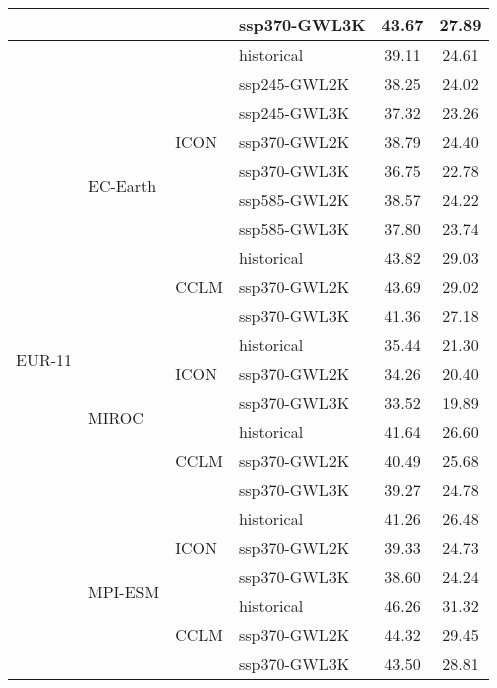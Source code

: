 \begin{table}[!htbp]
\begin{tabular}{lll|l|cc}
 &  &  & ssp370-GWL3K & 43.67 & 27.89 \\
\midrule
\multirow{22}{*}{EUR-11} & \multirow{10}{*}{EC-Earth} & \multirow{7}{*}{ICON} & historical & 39.11 & 24.61 \\
 &  &  & ssp245-GWL2K & 38.25 & 24.02 \\
 &  &  & ssp245-GWL3K & 37.32 & 23.26 \\
 &  &  & ssp370-GWL2K & 38.79 & 24.40 \\
 &  &  & ssp370-GWL3K & 36.75 & 22.78 \\
 &  &  & ssp585-GWL2K & 38.57 & 24.22 \\
 &  &  & ssp585-GWL3K & 37.80 & 23.74 \\
\cmidrule(lr){3-6}
 &  & \multirow{3}{*}{CCLM} & historical & 43.82 & 29.03 \\
 &  &  & ssp370-GWL2K & 43.69 & 29.02 \\
 &  &  & ssp370-GWL3K & 41.36 & 27.18 \\
\cmidrule(lr){3-6}
\cmidrule(lr){2-6}
 & \multirow{6}{*}{MIROC} & \multirow{3}{*}{ICON} & historical & 35.44 & 21.30 \\
 &  &  & ssp370-GWL2K & 34.26 & 20.40 \\
 &  &  & ssp370-GWL3K & 33.52 & 19.89 \\
\cmidrule(lr){3-6}
 &  & \multirow{3}{*}{CCLM} & historical & 41.64 & 26.60 \\
 &  &  & ssp370-GWL2K & 40.49 & 25.68 \\
 &  &  & ssp370-GWL3K & 39.27 & 24.78 \\
\cmidrule(lr){3-6}
\cmidrule(lr){2-6}
 & \multirow{6}{*}{MPI-ESM} & \multirow{3}{*}{ICON} & historical & 41.26 & 26.48 \\
 &  &  & ssp370-GWL2K & 39.33 & 24.73 \\
 &  &  & ssp370-GWL3K & 38.60 & 24.24 \\
\cmidrule(lr){3-6}
 &  & \multirow{3}{*}{CCLM} & historical & 46.26 & 31.32 \\
 &  &  & ssp370-GWL2K & 44.32 & 29.45 \\
 &  &  & ssp370-GWL3K & 43.50 & 28.81 \\
\bottomrule
\end{tabular}
\end{table}
